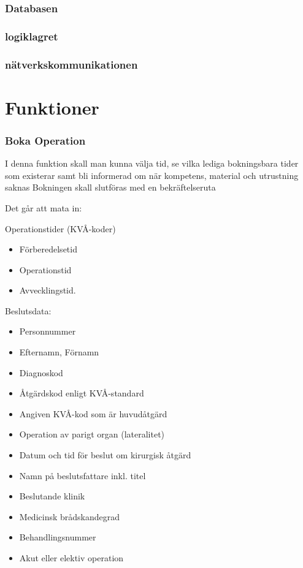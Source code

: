 \documentclass[a4paper,10pt]{article}
\begin{document}
        \subsubsection{Databasen}
        \subsubsection{logiklagret}
        \subsubsection{nätverkskommunikationen}

\section{Funktioner}

    \subsubsection{Boka Operation}

I denna funktion skall man kunna välja tid, se vilka lediga bokningsbara tider som existerar samt bli informerad om när kompetens, material och utrustning saknas
Bokningen skall slutföras med en bekräftelseruta

Det går att mata in:

Operationstider (KVÅ-koder)
\begin{itemize}
	\item Förberedelsetid
	\item Operationstid
	\item Avvecklingstid.
\end{itemize}

Beslutsdata:

\begin{itemize}
	\item Personnummer
	\item Efternamn, Förnamn
	\item Diagnoskod
	\item Åtgärdskod enligt KVÅ-standard
	\item Angiven KVÅ-kod som är huvudåtgärd
	\item Operation av parigt organ (lateralitet)
	\item Datum och tid för beslut om kirurgisk åtgärd
	\item Namn på beslutsfattare inkl. titel
	\item Beslutande klinik
	\item Medicinsk brådskandegrad
	\item Behandlingsnummer
	\item Akut eller elektiv operation

\end{itemize}
\end{document}
